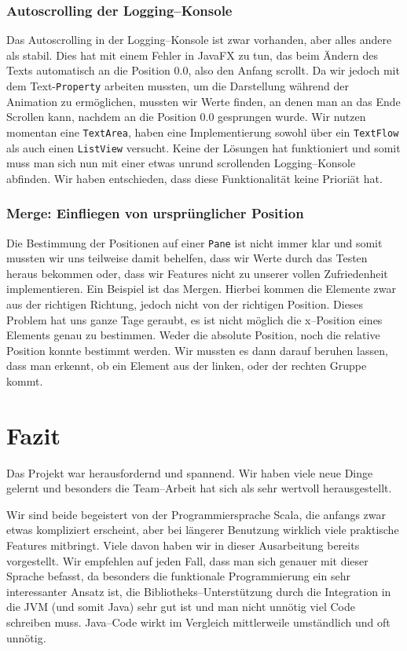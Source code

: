 \subsubsection{Autoscrolling der Logging--Konsole}
Das Autoscrolling in der Logging--Konsole ist zwar vorhanden, aber alles andere als stabil. Dies hat mit einem Fehler in JavaFX zu tun, das beim Ändern des Texts automatisch an die Position 0.0, also den Anfang scrollt. Da wir jedoch mit dem Text-\texttt{Property} arbeiten mussten, um die Darstellung während der Animation zu ermöglichen, mussten wir Werte finden, an denen man an das Ende Scrollen kann, nachdem an die Position 0.0 gesprungen wurde. Wir nutzen momentan eine \texttt{TextArea}, haben eine Implementierung sowohl über ein \texttt{TextFlow} als auch einen \texttt{ListView} versucht. Keine der Lösungen hat funktioniert und somit muss man sich nun mit einer etwas unrund scrollenden Logging--Konsole abfinden. Wir haben entschieden, dass diese Funktionalität keine Prioriät hat.

\subsubsection{Merge: Einfliegen von ursprünglicher Position}
Die Bestimmung der Positionen auf einer \texttt{Pane} ist nicht immer klar und somit mussten wir uns teilweise damit behelfen, dass wir Werte durch das Testen heraus bekommen oder, dass wir Features nicht zu unserer vollen Zufriedenheit implementieren. Ein Beispiel ist das Mergen. Hierbei kommen die Elemente zwar aus der richtigen Richtung, jedoch nicht von der richtigen Position. Dieses Problem hat uns ganze Tage geraubt, es ist nicht möglich die x--Position eines Elements genau zu bestimmen. Weder die absolute Position, noch die relative Position konnte bestimmt werden. Wir mussten es dann darauf beruhen lassen, dass man erkennt, ob ein Element aus der linken, oder der rechten Gruppe kommt.

\section{Fazit}\label{sec:fazit}
Das Projekt war herausfordernd und spannend. Wir haben viele neue Dinge gelernt und besonders die Team--Arbeit hat sich als sehr wertvoll herausgestellt.

Wir sind beide begeistert von der Programmiersprache Scala, die anfangs zwar etwas kompliziert erscheint, aber bei längerer Benutzung wirklich viele praktische Features mitbringt. Viele davon haben wir in dieser Ausarbeitung bereits vorgestellt. Wir empfehlen auf jeden Fall, dass man sich genauer mit dieser Sprache befasst, da besonders die funktionale Programmierung ein sehr interessanter Ansatz ist, die Bibliotheks--Unterstützung durch die Integration in die JVM (und somit Java) sehr gut ist und man nicht unnötig viel Code schreiben muss. Java--Code wirkt im Vergleich mittlerweile umständlich und oft unnötig.

